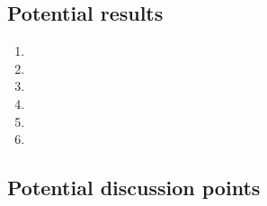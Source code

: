 \documentclass[10pt,letterpaper]{article}
\begin{document}
\subsection{Potential results}
\label{subsec:Results.}



\begin{enumerate}
  \item 
  \item
  \item
  \item
  \item
  \item
\end{enumerate}


\subsection{Potential discussion points}
\label{subsec:futureDiscussion}

\end{document}
